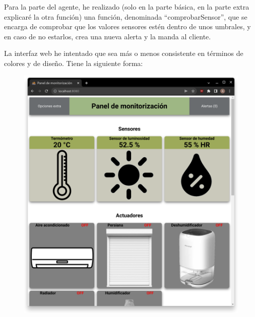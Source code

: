 \documentclass{article}
\begin{document}
\bigskip

Para la parte del agente, he realizado (solo en la parte básica, en la parte extra explicaré la otra función) una función, denominada ``comprobarSensor'', que se encarga de comprobar que los valores sensores estén dentro de unos umbrales, y en caso de no estarlos, crea una nueva alerta y la manda al cliente.

\bigskip

La interfaz web he intentado que sea más o menos consistente en términos de colores y de diseño. Tiene la siguiente forma:

\begin{figure}[H]
    \centering
    \begin{minipage}[H]{0.49\textwidth}
        \centering
        \includegraphics[width=\textwidth]{images/pagina1.png}
    \end{minipage}
    \hfill
    \begin{minipage}[H]{0.49\textwidth}
        \centering

\end{minipage}
\end{figure}
\end{document}

